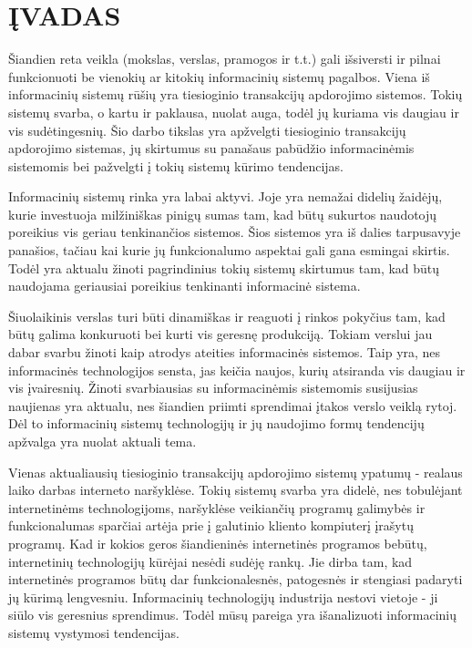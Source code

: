 \documentclass[12pt,a4paper,titlepage]{article}
\begin{document}

\let \savenumberline \numberline \def \numberline#1{\savenumberline{#1.}}
\tableofcontents \newpage

\begin{comment}
Įvade apibūdinamas darbo tikslas, temos aktualumas ir siekiami rezultatai. Darbo įvadas neturi būti dėstymo santrauka. Įvado apimtis 1–2 puslapiai.
\end{comment}

\section*{ĮVADAS}

Šiandien reta veikla (mokslas, verslas, pramogos ir t.t.) gali išsiversti ir pilnai funkcionuoti be vienokių ar kitokių informacinių sistemų pagalbos. Viena iš informacinių sistemų rūšių yra tiesioginio transakcijų apdorojimo sistemos. Tokių sistemų svarba, o kartu ir paklausa, nuolat auga, todėl jų kuriama vis daugiau ir vis sudėtingesnių. Šio darbo tikslas yra apžvelgti tiesioginio transakcijų apdorojimo sistemas, jų skirtumus su panašaus pabūdžio informacinėmis sistemomis bei pažvelgti į tokių sistemų kūrimo tendencijas.

Informacinių sistemų rinka yra labai aktyvi. Joje yra nemažai didelių žaidėjų, kurie investuoja milžiniškas pinigų sumas tam, kad būtų sukurtos naudotojų poreikius vis geriau tenkinančios sistemos. Šios sistemos yra iš dalies tarpusavyje panašios, tačiau kai kurie jų funkcionalumo aspektai gali gana esmingai skirtis. Todėl yra aktualu žinoti pagrindinius tokių sistemų skirtumus tam, kad būtų naudojama geriausiai poreikius tenkinanti informacinė sistema.

Šiuolaikinis verslas turi būti dinamiškas ir reaguoti į rinkos pokyčius tam, kad būtų galima konkuruoti bei kurti vis geresnę produkciją. Tokiam verslui jau dabar svarbu žinoti kaip atrodys ateities informacinės sistemos. Taip yra, nes informacinės technologijos sensta, jas keičia naujos, kurių atsiranda vis daugiau ir vis įvairesnių. Žinoti svarbiausias su informacinėmis sistemomis susijusias naujienas yra aktualu, nes šiandien priimti sprendimai įtakos verslo veiklą rytoj. Dėl to informacinių sistemų technologijų ir jų naudojimo formų tendencijų apžvalga yra nuolat aktuali tema.

Vienas aktualiausių tiesioginio transakcijų apdorojimo sistemų ypatumų - realaus laiko darbas interneto naršyklėse. Tokių sistemų svarba yra didelė, nes tobulėjant internetinėms technologijoms, naršyklėse veikiančių programų galimybės ir funkcionalumas sparčiai artėja prie į galutinio kliento kompiuterį įrašytų programų. Kad ir kokios geros šiandieninės internetinės programos bebūtų, internetinių technologijų kūrėjai nesėdi sudėję rankų. Jie dirba tam, kad internetinės programos būtų dar funkcionalesnės, patogesnės ir stengiasi padaryti jų kūrimą lengvesniu. Informacinių technologijų industrija nestovi vietoje - ji siūlo vis geresnius sprendimus. Todėl mūsų pareiga yra išanalizuoti informacinių sistemų vystymosi tendencijas.
\end{document}
